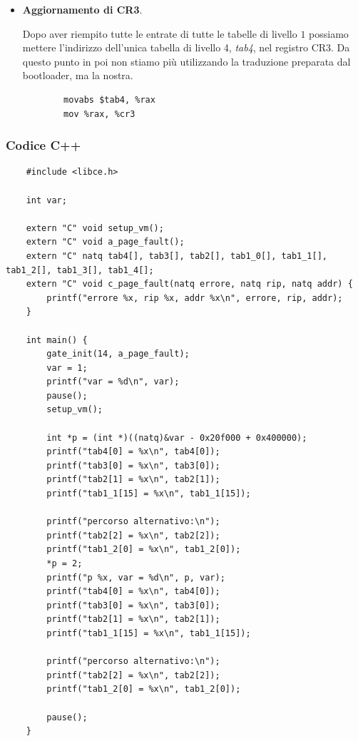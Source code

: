 \begin{itemize}
\begin{itemize}
	\end{itemize}
	\item \textbf{Aggiornamento di CR3}.
	
	Dopo aver riempito tutte le entrate di tutte le tabelle di livello $1$ possiamo mettere l'indirizzo dell'unica tabella di livello 4, \emph{tab4}, nel registro CR3. Da questo punto in poi non stiamo più utilizzando la traduzione preparata dal bootloader, ma la nostra.
	\begin{verbatim}
		movabs $tab4, %rax
		mov %rax, %cr3
	\end{verbatim}	
\end{itemize}
\normalsize 

\subsubsection{Codice C++} 
\small
\begin{verbatim}
	#include <libce.h>
	
	int var;
	
	extern "C" void setup_vm();
	extern "C" void a_page_fault();
	extern "C" natq tab4[], tab3[], tab2[], tab1_0[], tab1_1[], tab1_2[], tab1_3[], tab1_4[];
	extern "C" void c_page_fault(natq errore, natq rip, natq addr) {
		printf("errore %x, rip %x, addr %x\n", errore, rip, addr);
	}
	
	int main() {
		gate_init(14, a_page_fault);
		var = 1;
		printf("var = %d\n", var);
		pause();
		setup_vm();
		
		int *p = (int *)((natq)&var - 0x20f000 + 0x400000);
		printf("tab4[0] = %x\n", tab4[0]);
		printf("tab3[0] = %x\n", tab3[0]);
		printf("tab2[1] = %x\n", tab2[1]);
		printf("tab1_1[15] = %x\n", tab1_1[15]);
		
		printf("percorso alternativo:\n");
		printf("tab2[2] = %x\n", tab2[2]);
		printf("tab1_2[0] = %x\n", tab1_2[0]);
		*p = 2;
		printf("p %x, var = %d\n", p, var);
		printf("tab4[0] = %x\n", tab4[0]);
		printf("tab3[0] = %x\n", tab3[0]);
		printf("tab2[1] = %x\n", tab2[1]);
		printf("tab1_1[15] = %x\n", tab1_1[15]);
		
		printf("percorso alternativo:\n");
		printf("tab2[2] = %x\n", tab2[2]);
		printf("tab1_2[0] = %x\n", tab1_2[0]);
		
		pause();
	}
\end{verbatim}
